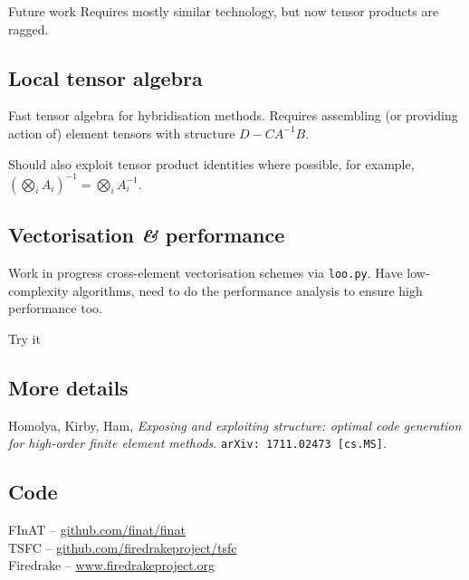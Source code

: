 \documentclass[cmyk,luatex,a0paper,portrait]{baposter}
\begin{document}
\begin{poster}
\begin{posterbox}[name=future, column=0, below=rules,
    span=3, height=0.235]{Future work}
    Requires mostly similar technology, but now tensor products are
    ragged.
    \vspace{-\baselineskip}
    \subsection*{Local tensor algebra}
    \vspace{-0.35\baselineskip}
    Fast tensor algebra for hybridisation methods.  Requires
    assembling (or providing action of) element tensors with
    structure $D - C A^{-1} B$.

    Should also exploit tensor product identities where possible,
    for example,
    $\left(\bigotimes_i A_i\right)^{-1} = \bigotimes_i A_i^{-1}$.
    \vspace{-\baselineskip}
    \subsection*{Vectorisation {\itshape\&} performance}
    \vspace{-0.35\baselineskip}
    Work in progress cross-element vectorisation schemes via
    \texttt{loo.py}.  Have low-complexity algorithms, need to do
    the performance analysis to ensure high performance too.
  \end{posterbox}    
  \begin{posterbox}[name=try, column=3, below=curl-curl,
    span=3, height=0.235]{Try it}
    \raggedright
    \subsection*{More details}
    \vspace{-0.35\baselineskip}
    Homolya, Kirby, Ham, \emph{Exposing and exploiting structure:
      optimal code generation for high-order finite element
      methods}. \texttt{arXiv:\,1711.02473\,[cs.MS]}.
    \vspace{-\baselineskip}
    \subsection*{Code}
    \vspace{-0.35\baselineskip}
    FInAT -- \url{github.com/finat/finat}\\[0.25\baselineskip]
    TSFC -- \url{github.com/firedrakeproject/tsfc}\\[0.25\baselineskip]
    Firedrake -- \url{www.firedrakeproject.org}


\end{posterbox}
\end{poster}
\end{document}
